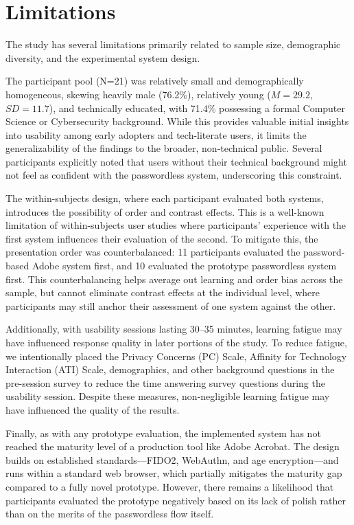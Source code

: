 \section{Limitations}
\label{sec:limitations}

The study has several limitations primarily related to sample size, demographic diversity, and the experimental system design.

The participant pool (N=21) was relatively small and demographically homogeneous, skewing heavily male (76.2\%), relatively young ($M=29.2$, $SD=11.7$), and technically educated, with 71.4\% possessing a formal Computer Science or Cybersecurity background. While this provides valuable initial insights into usability among early adopters and tech-literate users, it limits the generalizability of the findings to the broader, non-technical public. Several participants explicitly noted that users without their technical background might not feel as confident with the passwordless system, underscoring this constraint.

The within-subjects design, where each participant evaluated both systems, introduces the possibility of order and contrast effects. This is a well-known limitation of within-subjects user studies where participants' experience with the first system influences their evaluation of the second. To mitigate this, the presentation order was counterbalanced: 11 participants evaluated the password-based Adobe system first, and 10 evaluated the prototype passwordless system first. This counterbalancing helps average out learning and order bias across the sample, but cannot eliminate contrast effects at the individual level, where participants may still anchor their assessment of one system against the other.

Additionally, with usability sessions lasting 30--35 minutes, learning fatigue may have influenced response quality in later portions of the study. To reduce fatigue, we intentionally placed the Privacy Concerns (PC) Scale, Affinity for Technology Interaction (ATI) Scale, demographics, and other background questions in the pre-session survey to reduce the time answering survey questions during the usability session. Despite these measures, non-negligible learning fatigue may have influenced the quality of the results.

Finally, as with any prototype evaluation, the implemented system has not reached the maturity level of a production tool like Adobe Acrobat. The design builds on established standards---FIDO2, WebAuthn, and age encryption---and runs within a standard web browser, which partially mitigates the maturity gap compared to a fully novel prototype. However, there remains a likelihood that participants evaluated the prototype negatively based on its lack of polish rather than on the merits of the passwordless flow itself.

